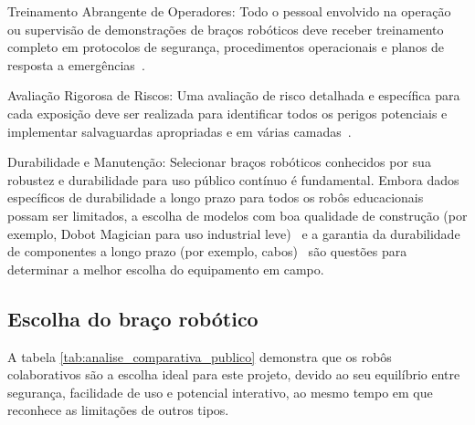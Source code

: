 \documentclass[%
  a4paper,%
  12pt,%
  fleqn,%
  english,%
  brazilian,%
]{article}
\begin{document}
\begin{description}
		\item Treinamento Abrangente de Operadores: Todo o pessoal envolvido na operação ou supervisão de demonstrações de braços robóticos deve receber treinamento completo em protocolos de segurança, procedimentos operacionais e planos de resposta a emergências~\cite{kinovaJacoAssistiveTechnologies2025}.
		\item Avaliação Rigorosa de Riscos: Uma avaliação de risco detalhada e específica para cada exposição deve ser realizada para identificar todos os perigos potenciais e implementar salvaguardas apropriadas e em várias camadas~\cite{top3dshopDobotMagicianReview2023}.
		\item Durabilidade e Manutenção: Selecionar braços robóticos conhecidos por sua robustez e durabilidade para uso público contínuo é fundamental. Embora dados específicos de durabilidade a longo prazo para todos os robôs educacionais possam ser limitados, a escolha de modelos com boa qualidade de construção (por exemplo, Dobot Magician para uso industrial leve)~\cite{robotlabDobotClassroomPack2025} e a garantia da durabilidade de componentes a longo prazo (por exemplo, cabos)~\cite{bostonDynamicsSpot2025} são questões para determinar a melhor escolha do equipamento em campo.
	\end{description}

\subsection{Escolha do braço robótico}
\label{sec:escolha_braco_robotico}
A tabela \ref{tab:analise_comparativa_publico} demonstra que os robôs colaborativos são a escolha ideal para este projeto, devido ao seu equilíbrio entre segurança, facilidade de uso e potencial interativo, ao mesmo tempo em que reconhece as limitações de outros tipos.
\end{document}
